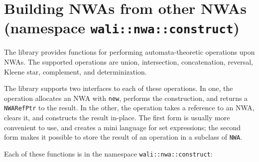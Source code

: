 \section{Building NWAs from other NWAs (namespace \texttt{wali::nwa::construct})}
\label{Se:Building NWAs}

The library provides functions for performing automata-theoretic operations upon
NWAs. The supported operations are union, intersection, concatenation,
reversal, Kleene star, complement, and determinization.

The library supports two interfaces to each of these operations. In one, the
operation allocates an NWA with \texttt{new}, performs the construction, and
returns a \texttt{NWARefPtr} to the result.  In the other, the operation takes
a reference to an NWA, clears it, and constructs the result in-place. The
first form is usually more convenient to use, and creates a mini language for
set expressions; the second form makes it possible to store the result of an
operation in a subclass of \texttt{NWA}.

Each of these functions is in the namespace \texttt{wali::nwa::construct}:


